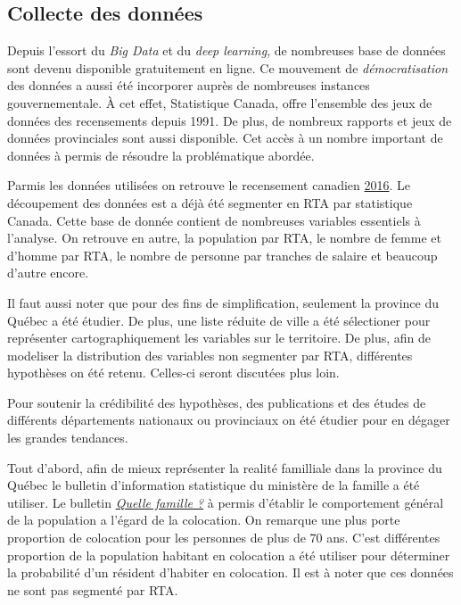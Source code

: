 \documentclass[11pt,french]{report}\usepackage[]{graphicx}\usepackage[]{color}
\begin{document}
\subsection*{Collecte des données}
Depuis l'essort du \emph{Big Data} et du \emph{deep learning}, de nombreuses base de données sont devenu disponible gratuitement en ligne. Ce mouvement de \emph{démocratisation} des données a aussi été incorporer auprès de nombreuses instances gouvernementale. À cet effet, Statistique Canada, offre l'ensemble des jeux de données des recensements depuis 1991. De plus, de nombreux rapports et jeux de données provinciales sont aussi disponible. Cet accès à un nombre important de données à permis de résoudre la problématique abordée.
\newline

Parmis les données utilisées on retrouve le recensement canadien \href{http://www12.statcan.gc.ca/census-recensement/2016/dp-pd/prof/details/download-telecharger/comp/page_dl-tc.cfm?Lang=F}{2016}. Le découpement des données est a déjà été segmenter en RTA par statistique Canada. Cette base de donnée contient de nombreuses variables essentiels à l'analyse. On retrouve en autre, la population par RTA, le nombre de femme et d'homme par RTA, le nombre de personne par tranches de salaire et beaucoup d'autre encore. 
\newline

Il faut aussi noter que pour des fins de simplification, seulement la province du Québec a été étudier. De plus, une liste réduite de ville a été sélectioner pour représenter cartographiquement les variables sur le territoire. De plus, afin de modeliser la distribution des variables non segmenter par RTA, différentes hypothèses on été retenu. Celles-ci seront discutées plus loin. 
\newline

Pour soutenir la crédibilité des hypothèses, des publications et des études de différents départements nationaux ou provinciaux on été étudier pour en dégager les grandes tendances. 
\newline

Tout d'abord, afin de mieux représenter la realité familliale dans la province du Québec le bulletin d'information statistique du ministère de la famille a été utiliser. Le bulletin \href{https://www.mfa.gouv.qc.ca/fr/Famille/chiffres-famille-quebec/bulletin_quelle_famille/Pages/aut2013_no1_tab4.aspx}{\emph{Quelle famille ?}} à permis d'établir le comportement général de la population a l'égard de la colocation. On remarque une plus porte proportion de colocation pour les personnes de plus de 70 ans. C'est différentes proportion de la population habitant en colocation a été utiliser pour déterminer la probabilité d'un résident d'habiter en colocation. Il est à noter que ces données ne sont pas segmenté par RTA.
\newline
\end{document}
